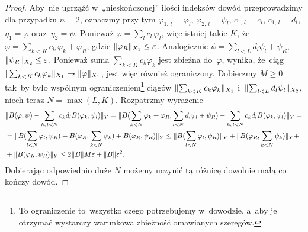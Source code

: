 \documentclass[a4paper,11pt]{article}
\numberwithin{equation}{section}
\begin{document}
\begin{proof}

  Aby~nie ugrząźć w~„nieskończonej” ilości indeksów dowód
  przeprowadzimy dla przypadku $n = 2$, oznaczmy przy tym
  $\varphi_{ 1,\, l } = \varphi_{ l }$, $\varphi_{ 2, \, l } = \psi_{ l }$,
  $c_{ 1, \, l } = c_{ l }$, $c_{ 1, \, l } = d_{ l }$,
  $\eta_{ 1 } = \varphi$ oraz~$\eta_{ 2 } = \psi$. Ponieważ
  $\varphi = \sum_{ l } c_{ l } \, \varphi_{ l }$, więc istniej takie $K$,
  że~$\varphi = \sum_{ k < K } c_{ k } \, \varphi_{ k } + \varphi_{ R }$, gdzie
  $\lVert{  \varphi_{ R }  }\rVert_{ X_{ 1 } } \leq \varepsilon$. Analogicznie
  $\psi = \sum_{ l < L } d_{ l } \psi_{ l } + \psi_{ R }$,
  $\lVert{  \psi_{ R }  }\rVert_{ X_{ 2 } } \leq \varepsilon$. Ponieważ suma
  $\sum_{ k < K } c_{ k } \varphi_{ k }$ jest zbieżna do~$\varphi$, wynika,
  że~ciąg
  $\lVert{  \sum_{ k < K } c_{ k } \varphi_{ k }  }\rVert_{ X_{ 1 } } \to \lVert{ 
    \varphi  }\rVert_{ X_{ 1 } }$, jest więc również ograniczony. Dobierzmy
  $M \geq 0$ tak~by było wspólnym ograniczeniem\footnote{To
    ograniczenie to~wszystko czego potrzebujemy w~dowodzie, a~aby je
    otrzymać wystarczy warunkowa zbieżność omawianych szeregów.}
  ciągów $\lVert{  \sum_{ k < K } c_{ k } \varphi_{ k }  }\rVert_{ X_{ 1 } }$
  i~$\lVert{  \sum_{ l < L } d_{ l } \psi_{ l }  }\rVert_{ X_{ 2 } }$, niech
  teraz $N = \max( L, K )$. Rozpatrzmy wyrażenie
  \begin{equation}
    \begin{split}
      \label{eq:RS-Vol-I-s02-06}
      &\Vert B( \varphi, \psi ) - \sum_{ k, \, l < N } c_{ k } d_{ l }
        B( \varphi_{ k }, \psi_{ l } ) \Vert_{ Y } =
        \Vert B( \sum_{ k < N } \varphi_{ k } + \varphi_{ R }, \sum_{ l < N } d_{ l } \psi_{ l } +
        \psi_{ R } ) - \sum_{ k,\, l < N } c_{ k } d_{ l }
        B( \varphi_{ k }, \psi_{ l } ) \Vert_{ Y } = \\
      &=
        \Vert B( \sum_{ l < N } \varphi_{ l }, \psi_{ R } )
        + B( \varphi_{ R }, \sum_{ k < N } \psi_{ k } )
        + B( \varphi_{ R }, \psi_{ R } ) \Vert_{ Y } \leq
        \Vert B( \sum_{ l < N } \varphi_{ l }, \psi_{ R } ) \Vert_{ Y }
        + \Vert B( \varphi_{ R }, \sum_{ k < N } \psi_{ k } ) \Vert_{ Y } + \\
      &+ \Vert B( \varphi_{ R }, \psi_{ R } ) \Vert_{ Y }
        \leq 2 \lVert{  B  }\rVert M \varepsilon + \lVert{  B  }\rVert \varepsilon^{ 2 }.
    \end{split}
  \end{equation}
  Dobierając odpowiednio duże $N$ możemy uczynić tą różnicę dowolnie
  małą co kończy dowód.

\end{proof}
\end{document}
